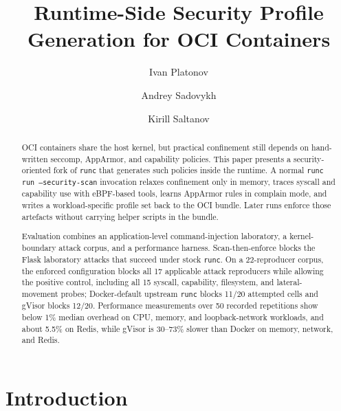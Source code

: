\documentclass[runningheads]{llncs}
\begin{document}
\title{Runtime-Side Security Profile Generation for OCI Containers}

\author{Ivan Platonov \and Andrey Sadovykh \and Kirill Saltanov}

\maketitle

\begin{abstract}
OCI containers share the host kernel, but practical confinement still depends on hand-written seccomp, AppArmor, and capability policies. This paper presents a security-oriented fork of \texttt{runc} that generates such policies inside the runtime. A normal \texttt{runc run --security-scan} invocation relaxes confinement only in memory, traces syscall and capability use with eBPF-based tools, learns AppArmor rules in complain mode, and writes a workload-specific profile set back to the OCI bundle. Later runs enforce those artefacts without carrying helper scripts in the bundle.

Evaluation combines an application-level command-injection laboratory, a kernel-boundary attack corpus, and a performance harness. Scan-then-enforce blocks the Flask laboratory attacks that succeed under stock \texttt{runc}. On a 22-reproducer corpus, the enforced configuration blocks all 17 applicable attack reproducers while allowing the positive control, including all 15 syscall, capability, filesystem, and lateral-movement probes; Docker-default upstream \texttt{runc} blocks 11/20 attempted cells and gVisor blocks 12/20. Performance measurements over 50 recorded repetitions show below 1\% median overhead on CPU, memory, and loopback-network workloads, and about 5.5\% on Redis, while gVisor is 30--73\% slower than Docker on memory, network, and Redis.
\end{abstract}

\section{Introduction}
\end{document}
